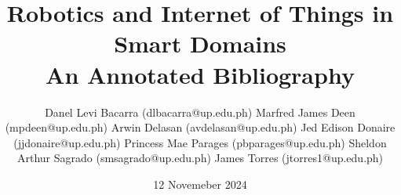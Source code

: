 \documentclass[11pt]{article}
\title{Robotics and Internet of Things in Smart Domains\\\medskip An Annotated Bibliography}
\author{
	Danel Levi Bacarra (dlbacarra@up.edu.ph)
	Marfred James Deen (mpdeen@up.edu.ph)
	Arwin Delasan (avdelasan@up.edu.ph)
	Jed Edison Donaire (jjdonaire@up.edu.ph)
	Princess Mae Parages (pbparages@up.edu.ph)
	Sheldon Arthur Sagrado (smsagrado@up.edu.ph)
	James Torres (jtorres1@up.edu.ph)
}
\date{12 Novemeber 2024}
\begin{document}
\maketitle
\nocite{*} %


\end{document}
